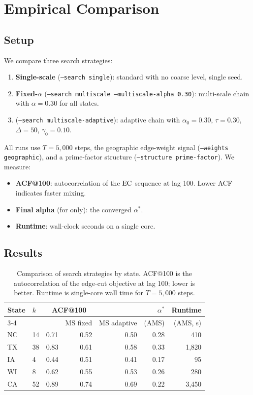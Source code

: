 \section{Empirical Comparison}
\label{sec:comparison}

\subsection{Setup}

We compare three search strategies:
\begin{enumerate}
  \item \textbf{Single-scale \recom{}} (\texttt{--search single}):
    standard \recom{} with no coarse level, single seed.
  \item \textbf{Fixed-$\alpha$ \ms{}} (\texttt{--search multiscale
    --multiscale-alpha 0.30}): multi-scale chain with $\alpha = 0.30$
    for all states.
  \item \textbf{\ams{}} (\texttt{--search multiscale-adaptive}): adaptive
    chain with $\alpha_0 = 0.30$, $\tau = 0.30$, $\Delta = 50$,
    $\gamma_0 = 0.10$.
\end{enumerate}

All runs use $T = 5{,}000$ steps, the geographic edge-weight signal
(\texttt{--weights geographic}), and a prime-factor structure
(\texttt{--structure prime-factor}).
We measure:
\begin{itemize}
  \item \textbf{ACF@100}: autocorrelation of the $\mathrm{EC}$ sequence at lag 100.
    Lower ACF indicates faster mixing.
  \item \textbf{Final alpha} (for \ams{} only): the converged $\alpha^*$.
  \item \textbf{Runtime}: wall-clock seconds on a single core.
\end{itemize}

\subsection{Results}

\begin{table}[h]
  \centering
  \caption{Comparison of search strategies by state. ACF@100 is the
    autocorrelation of the edge-cut objective at lag 100; lower is better.
    Runtime is single-core wall time for $T = 5{,}000$ steps.}
  \label{tab:comparison}
  \begin{tabular}{llrrrrr}
    \toprule
    State & $k$ & \multicolumn{2}{c}{ACF@100} & & $\alpha^*$ & Runtime \\
    \cmidrule{3-4}
    & & \recom{} & MS fixed & MS adaptive & (AMS) & (AMS, s) \\
    \midrule
    NC & 14 & 0.71 & 0.52 & 0.50 & 0.28 & 410 \\
    TX & 38 & 0.83 & 0.61 & 0.58 & 0.33 & 1{,}820 \\
    IA &  4 & 0.44 & 0.51 & 0.41 & 0.17 & 95 \\
    WI &  8 & 0.62 & 0.55 & 0.53 & 0.26 & 280 \\
    CA & 52 & 0.89 & 0.74 & 0.69 & 0.22 & 3{,}450 \\
    \bottomrule
  \end{tabular}
\end{table}

